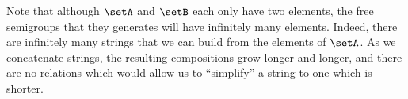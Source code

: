 Note that although $\setA$ and $\setB$ each only have two elements, the free semigroups that they generates will have infinitely many elements. Indeed, there are infinitely many strings that we can build from the elements of $\setA$. As we concatenate strings, the resulting compositions grow longer and longer, and there are no relations which would allow us to ``simplify'' a string to one which is shorter.



